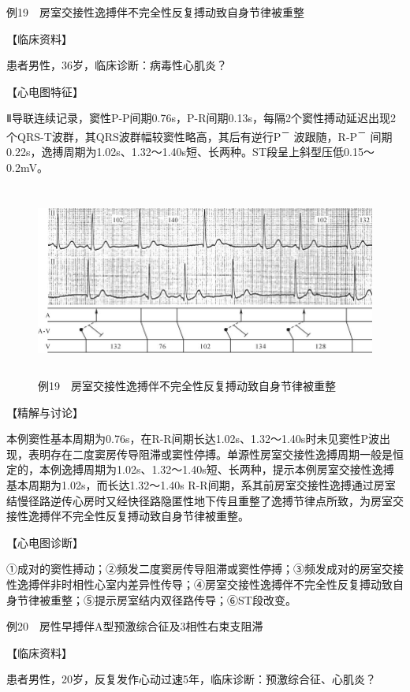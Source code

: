 例19　房室交接性逸搏伴不完全性反复搏动致自身节律被重整

【临床资料】

患者男性，36岁，临床诊断：病毒性心肌炎？

【心电图特征】

Ⅱ导联连续记录，窦性P-P间期0.76s，P-R间期0.13s，每隔2个窦性搏动延迟出现2个QRS-T波群，其QRS波群幅较窦性略高，其后有逆行P\textsuperscript{－}
波跟随，R-P\textsuperscript{－}
间期0.22s，逸搏周期为1.02s、1.32～1.40s短、长两种。ST段呈上斜型压低0.15～0.2mV。

\begin{figure}[!htbp]
 \centering
 \includegraphics[width=5.76042in,height=2.48958in]{./images/Image00777.jpg}
 \captionsetup{justification=centering}
 \caption{例19　房室交接性逸搏伴不完全性反复搏动致自身节律被重整}
 \label{fig50-19}
  \end{figure} 

【精解与讨论】

本例窦性基本周期为0.76s，在R-R间期长达1.02s、1.32～1.40s时未见窦性P波出现，表明存在二度窦房传导阻滞或窦性停搏。单源性房室交接性逸搏周期一般是恒定的，本例逸搏周期为1.02s、1.32～1.40s短、长两种，提示本例房室交接性逸搏基本周期为1.02s，而长达1.32～1.40s
R-R间期，系其前房室交接性逸搏通过房室结慢径路逆传心房时又经快径路隐匿性地下传且重整了逸搏节律点所致，为房室交接性逸搏伴不完全性反复搏动致自身节律被重整。

【心电图诊断】

①成对的窦性搏动；②频发二度窦房传导阻滞或窦性停搏；③频发成对的房室交接性逸搏伴非时相性心室内差异性传导；④房室交接性逸搏伴不完全性反复搏动致自身节律被重整；⑤提示房室结内双径路传导；⑥ST段改变。

例20　房性早搏伴A型预激综合征及3相性右束支阻滞

【临床资料】

患者男性，20岁，反复发作心动过速5年，临床诊断：预激综合征、心肌炎？

